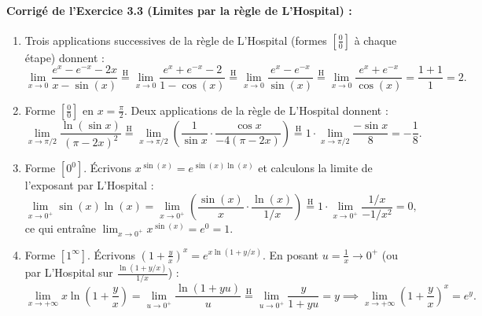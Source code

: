 \paragraph{Corrigé de l'Exercice 3.3 (Limites par la règle de L'Hospital) :}
\begin{enumerate}[label=(\alph*)]
    \item Trois applications successives de la règle de L'Hospital (formes $\left[\frac{0}{0}\right]$ à chaque étape) donnent :
    \[
        \lim_{x \to 0} \frac{e^x - e^{-x} - 2x}{x - \sin(x)} \stackrel{\text{H}}{=} \lim_{x \to 0} \frac{e^x + e^{-x} - 2}{1 - \cos(x)} \stackrel{\text{H}}{=} \lim_{x \to 0} \frac{e^x - e^{-x}}{\sin(x)} \stackrel{\text{H}}{=} \lim_{x \to 0} \frac{e^x + e^{-x}}{\cos(x)} = \frac{1 + 1}{1} = \boxed{2}.
    \]
    \item Forme $\left[\frac{0}{0}\right]$ en $x = \frac{\pi}{2}$. Deux applications de la règle de L'Hospital donnent :
    \[
        \lim_{x \to \pi/2} \frac{\ln(\sin x)}{(\pi - 2x)^2} \stackrel{\text{H}}{=} \lim_{x \to \pi/2} \left(\frac{1}{\sin x} \cdot \frac{\cos x}{-4(\pi - 2x)}\right) \stackrel{\text{H}}{=} 1 \cdot \lim_{x \to \pi/2} \frac{-\sin x}{8} = \boxed{-\frac{1}{8}}.
    \]
    \item Forme $[0^0]$. Écrivons $x^{\sin(x)} = e^{\sin(x)\ln(x)}$ et calculons la limite de l'exposant par L'Hospital :
    \[
        \lim_{x \to 0^+} \sin(x)\ln(x) = \lim_{x \to 0^+} \left(\frac{\sin(x)}{x} \cdot \frac{\ln(x)}{1/x}\right) \stackrel{\text{H}}{=} 1 \cdot \lim_{x \to 0^+} \frac{1/x}{-1/x^2} = 0,
    \]
    ce qui entraîne $\lim_{x \to 0^+} x^{\sin(x)} = e^0 = \boxed{1}$.
    \item Forme $[1^\infty]$. Écrivons $\left(1 + \frac{y}{x}\right)^x = e^{x\ln(1 + y/x)}$. En posant $u = \frac{1}{x} \to 0^+$ (ou par L'Hospital sur $\frac{\ln(1+y/x)}{1/x}$) :
    \[
        \lim_{x \to +\infty} x\ln\left(1 + \frac{y}{x}\right) = \lim_{u \to 0^+} \frac{\ln(1 + yu)}{u} \stackrel{\text{H}}{=} \lim_{u \to 0^+} \frac{y}{1 + yu} = y \implies \boxed{\lim_{x \to +\infty} \left(1 + \frac{y}{x}\right)^x = e^y}.
    \]
\end{enumerate}

